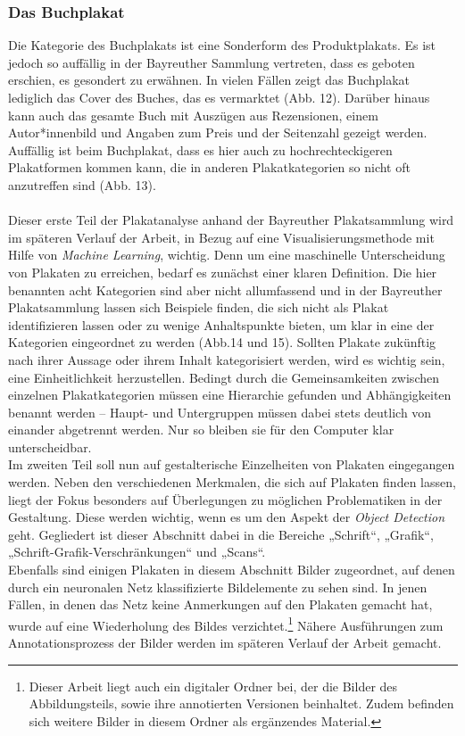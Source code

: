 \documentclass[a4paper,12pt,ngerman]{article}
\begin{document}
\subsubsection{Das Buchplakat}
Die Kategorie des Buchplakats ist eine Sonderform des Produktplakats. Es ist jedoch so auffällig in der Bayreuther Sammlung vertreten, dass es geboten erschien, es gesondert zu erwähnen. In vielen Fällen zeigt das Buchplakat lediglich das Cover des Buches, das es vermarktet (Abb. 12). Darüber hinaus kann auch das gesamte Buch mit Auszügen aus Rezensionen, einem Autor*innenbild und Angaben zum Preis und der Seitenzahl gezeigt werden. Auffällig ist beim Buchplakat, dass es hier auch zu hochrechteckigeren Plakatformen kommen kann, die in anderen Plakatkategorien so nicht oft anzutreffen sind (Abb. 13). \\
\\
Dieser erste Teil der Plakatanalyse anhand der Bayreuther Plakatsammlung wird im späteren Verlauf der Arbeit, in Bezug auf eine Visualisierungsmethode mit Hilfe von \textit{Machine Learning}, wichtig. Denn um eine maschinelle Unterscheidung von Plakaten zu erreichen, bedarf es zunächst einer klaren Definition. Die hier benannten acht Kategorien sind aber nicht allumfassend und in der Bayreuther Plakatsammlung lassen sich Beispiele finden, die sich nicht als Plakat identifizieren lassen oder zu wenige Anhaltspunkte bieten, um klar in eine der Kategorien eingeordnet zu werden (Abb.14 und 15). Sollten Plakate zukünftig nach ihrer Aussage oder ihrem Inhalt kategorisiert werden, wird es wichtig sein, eine Einheitlichkeit herzustellen. Bedingt durch die Gemeinsamkeiten zwischen einzelnen Plakatkategorien müssen eine Hierarchie gefunden und Abhängigkeiten benannt werden -- Haupt- und Untergruppen müssen dabei stets deutlich von einander abgetrennt werden. Nur so bleiben sie für den Computer klar unterscheidbar.\\
Im zweiten Teil soll nun auf gestalterische Einzelheiten von Plakaten eingegangen werden. Neben den verschiedenen Merkmalen, die sich auf Plakaten finden lassen, liegt der Fokus besonders auf Überlegungen zu möglichen Problematiken in der Gestaltung. Diese werden wichtig, wenn es um den Aspekt der \textit{Object Detection} geht. Gegliedert ist dieser Abschnitt dabei in die Bereiche „Schrift“, „Grafik“, „Schrift-Grafik-Verschränkungen“ und „Scans“. \\
Ebenfalls sind einigen Plakaten in diesem Abschnitt Bilder zugeordnet, auf denen durch ein neuronalen Netz klassifizierte Bildelemente zu sehen sind. In jenen Fällen, in denen das Netz keine Anmerkungen auf den Plakaten gemacht hat, wurde auf eine Wiederholung des Bildes verzichtet.\footnote{Dieser Arbeit liegt auch ein digitaler Ordner bei, der die Bilder des Abbildungsteils, sowie ihre annotierten Versionen beinhaltet. Zudem befinden sich weitere Bilder in diesem Ordner als ergänzendes Material.}  Nähere Ausführungen zum Annotationsprozess der Bilder werden im späteren Verlauf der Arbeit gemacht. \\
\end{document}
